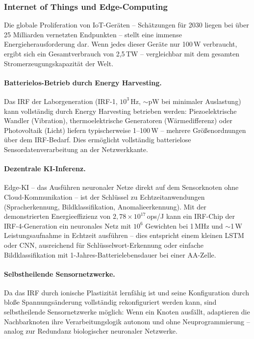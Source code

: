 ﻿\documentclass[a4paper,12pt]{scrreprt}
\theoremstyle{definition}
\begin{document}
\subsubsection{Internet of Things und Edge-Computing}
\label{subsubsec:iot}

Die globale Proliferation von IoT-Geräten -- Schätzungen für 2030 liegen
bei über 25 Milliarden vernetzten Endpunkten -- stellt eine immense
Energieherausforderung dar. Wenn jedes dieser Geräte nur 100\,\textmu W
verbraucht, ergibt sich ein Gesamtverbrauch von 2{,}5\,TW -- vergleichbar
mit dem gesamten Stromerzeugungskapazität der Welt.

\paragraph{Batterielos-Betrieb durch Energy Harvesting.}
Das IRF der Laborgeneration (IRF-1, $10^3$\,Hz, $\sim$pW bei minimaler
Auslastung) kann vollständig durch Energy Harvesting betrieben werden:
Piezoelektrische Wandler (Vibration), thermoelektrische Generatoren
(Wärmedifferenz) oder Photovoltaik (Licht) liefern typischerweise
1--100\,\textmu W -- mehrere Größenordnungen über dem IRF-Bedarf.
Dies ermöglicht vollständig batterielose Sensordatenverarbeitung an der
Netzwerkkante.

\paragraph{Dezentrale KI-Inferenz.}
Edge-KI -- das Ausführen neuronaler Netze direkt auf dem Sensorknoten
ohne Cloud-Kommunikation -- ist der Schlüssel zu Echtzeitanwendungen
(Spracherkennung, Bildklassifikation, Anomalieerkennung). Mit der
demonstrierten Energieeffizienz von $2{,}78 \times 10^{17}$\,ops/J
kann ein IRF-Chip der IRF-4-Generation ein neuronales Netz mit
$10^6$ Gewichten bei 1\,MHz und $\sim$1\,\textmu W Leistungsaufnahme
in Echtzeit ausführen -- dies entspricht einem kleinen LSTM oder CNN,
ausreichend für Schlüsselwort-Erkennung oder einfache
Bildklassifikation mit 1-Jahres-Batterielebensdauer bei einer
AA-Zelle.

\paragraph{Selbstheilende Sensornetzwerke.}
Da das IRF durch ionische Plastizität lernfähig ist und seine Konfiguration
durch bloße Spannungsänderung vollständig rekonfiguriert werden kann,
sind selbstheilende Sensornetzwerke möglich: Wenn ein Knoten ausfällt,
adaptieren die Nachbarknoten ihre Verarbeitungslogik autonom und
ohne Neuprogrammierung -- analog zur Redundanz biologischer neuronaler
Netzwerke.
\end{document}
